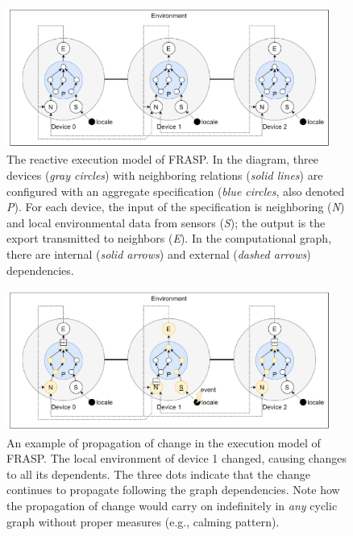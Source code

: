 \clearpage
\begin{figure}[!ht]
  \centering
  \includegraphics[width=0.95\textwidth]{resources/figures/frasp-simulation.pdf}
  \caption[The reactive execution model of FRASP]{
    The reactive execution model of FRASP. In the diagram, three
    devices (\textit{gray circles}) with neighboring relations (\textit{solid
      lines}) are configured with an aggregate specification (\textit{blue
      circles}, also denoted \textit{P}). For each device, the input of the
    specification is neighboring (\textit{N}) and local environmental data
    from sensors (\textit{S}); the output is the export transmitted to
    neighbors (\textit{E}). In the computational graph, there are internal
    (\textit{solid arrows}) and external (\textit{dashed arrows})
    dependencies.
  }
  \label{figure:frasp-simulation}
\end{figure}

\begin{figure}[!ht]
  \centering
  \includegraphics[width=0.95\textwidth]{resources/figures/frasp-simulation-example.pdf}
  \caption[Propagation of change in the reactive execution model of FRASP]{
    An example of propagation of change in the execution model of FRASP. The
    local environment of device 1 changed, causing changes to all its
    dependents. The three dots indicate that the change continues to propagate
    following the graph dependencies. Note how the propagation of change would
    carry on indefinitely in \textit{any} cyclic graph without proper measures
    (e.g., calming pattern).
  }
  \label{figure:frasp-simulation-example}
\end{figure}

